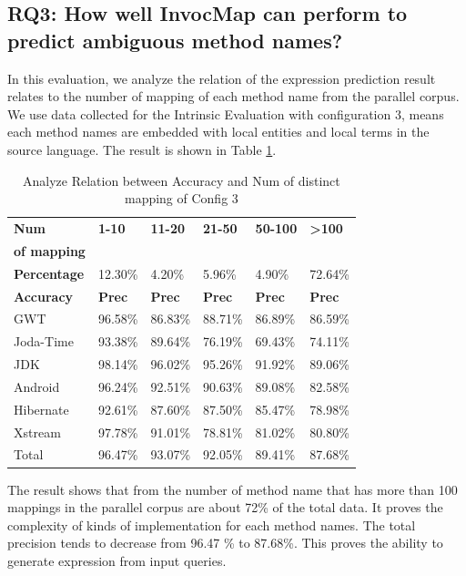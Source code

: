 \subsection{RQ3: How well InvocMap can perform to predict ambiguous method names?}

In this evaluation, we analyze the relation of the expression prediction result relates to the number of mapping of each method name from the parallel corpus. We use data collected for the Intrinsic Evaluation with configuration 3, means each method names are embedded with local entities and local terms in the source language. The result is shown in Table \ref{tbl:Analyze1}.

\begin{table}[]
\small
\centering
\caption{Analyze Relation between Accuracy and Num of distinct mapping of Config 3}
\begin{tabular}{|l|l|l|l|l|l|}
\hline
              
\textbf{Num }& \textbf{1-10}        & \textbf{11-20}       & \textbf{21-50}       & \textbf{50-100}      & \textbf{\textgreater{}100}     \\
\textbf{of mapping }&         &        &        &       &      \\ \hline
\textbf{Percentage  }   & 12.30\%     & 4.20\%      & 5.96\%      & 4.90\%      & 72.64\%               \\ \hline
\textbf{Accuracy }      & \textbf{Prec}        & \textbf{Prec}        & \textbf{Prec}        & \textbf{Prec}        & \textbf{Prec}                  \\ \hline
GWT            & 96.58\%     & 86.83\%     & 88.71\%     & 86.89\%     & 86.59\%               \\ \hline
Joda-Time      & 93.38\%     & 89.64\%     & 76.19\%     & 69.43\%     & 74.11\%               \\ \hline
JDK            & 98.14\%     & 96.02\%     & 95.26\%     & 91.92\%     & 89.06\%               \\ \hline
Android        & 96.24\%     & 92.51\%     & 90.63\%     & 89.08\%     & 82.58\%               \\ \hline
Hibernate      & 92.61\%     & 87.60\%     & 87.50\%     & 85.47\%     & 78.98\%               \\ \hline
Xstream        & 97.78\%     & 91.01\%     & 78.81\%     & 81.02\%     & 80.80\%               \\ \hline
Total          & 96.47\%     & 93.07\%     & 92.05\%     & 89.41\%     & 87.68\%               \\ \hline
\end{tabular}

\label{tbl:Analyze1}
\end{table}
The result shows that from the number of method name that has more than 100 mappings in the parallel corpus are about 72\% of the total data. It proves the complexity of kinds of implementation for each method names. The total precision tends to decrease from 96.47 \% to 87.68\%. This proves the ability to generate expression from input queries.





